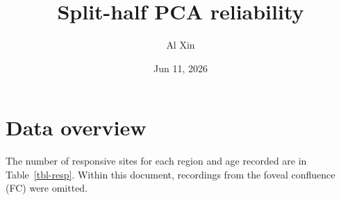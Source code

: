 \documentclass[
  10pt,
  letterpaper,
  DIV=11,
  numbers=noendperiod]{scrartcl}
\title{Split-half PCA reliability}
\author{Al Xin}
\date{Jun 11, 2026}
\begin{document}
\maketitle


\section{Data overview}\label{data-overview}

The number of responsive sites for each region and age recorded are in
Table~\ref{tbl-resp}. Within this document, recordings from the foveal
confluence (FC) were omitted.

\begin{table}

\caption{\label{tbl-resp}Number of responsive sites found for each
region and age recorded, with arrays numbered arbitrarily.}

\centering{

}
\end{table}
\end{document}
